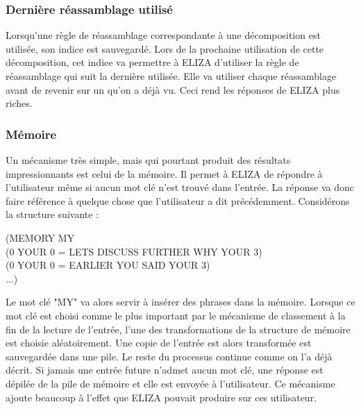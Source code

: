 \documentclass[11pt, a4paper]{report}
\begin{document}
  \subsubsection{Dernière réassamblage utilisé}
  Lorsqu'une règle de réassamblage correspondante à une décomposition 
  est utilisée, son indice est sauvegardé. 
  Lors de la prochaine utilisation de cette décomposition, cet indice 
  va permettre à ELIZA d'utiliser la règle de réassamblage qui suit la dernière utilisée. 
  Elle va utiliser chaque réassamblage avant de revenir sur un qu'on a déjà vu. 
  Ceci rend les réponses de ELIZA plus riches.
  
  \subsubsection{Mémoire}
  Un mécanisme très simple, mais qui pourtant produit des résultats impressionnants est celui 
  de la mémoire. Il permet à ELIZA de répondre à l'utilisateur même si aucun mot clé n'est trouvé 
  dans l'entrée. La réponse va donc faire référence à quelque chose que l'utilisateur a dit 
  précédemment. Considérons la structure suivante : 

  \begin{center}
    (MEMORY MY \\
    (0 YOUR 0 = LETS DISCUSS FURTHER WHY YOUR 3) \\
    (0 YOUR 0 = EARLIER YOU SAID YOUR 3) \\
    ...)
  \end{center}

  Le mot clé "MY" va alors servir à insérer des phrases dans la mémoire. Lorsque ce mot clé 
  est choisi comme le plus important par le mécanisme de classement à la fin de la lecture 
  de l'entrée, l'une des transformations de la structure de mémoire est choisie aléatoirement. 
  Une copie de l'entrée est alors transformée est sauvegardée dans une pile. Le reste du processus 
  continue comme on l'a déjà décrit. Si jamais une entrée future n'admet aucun mot clé, une réponse 
  est dépilée de la pile de mémoire et elle est envoyée à l'utilisateur. Ce mécanisme ajoute 
  beaucoup à l'effet que ELIZA pouvait produire sur ces utilisateur. 
\end{document}
